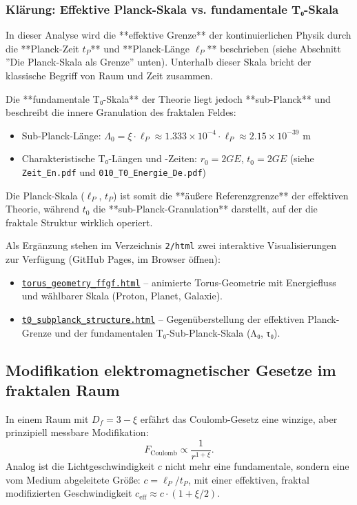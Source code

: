 	\subsubsection{Klärung: Effektive Planck-Skala vs. fundamentale T₀-Skala}
	In dieser Analyse wird die **effektive Grenze** der kontinuierlichen Physik durch die **Planck-Zeit \( t_P \)** und **Planck-Länge \(\ell_P\)** beschrieben (siehe Abschnitt ''Die Planck-Skala als Grenze'' unten). Unterhalb dieser Skala bricht der klassische Begriff von Raum und Zeit zusammen.
	
	Die **fundamentale T₀-Skala** der Theorie liegt jedoch **sub-Planck** und beschreibt die innere Granulation des fraktalen Feldes:
	\begin{itemize}
		\item Sub-Planck-Länge: \(\Lambda_0 = \xi \cdot \ell_P \approx 1.333 \times 10^{-4} \cdot \ell_P \approx 2.15 \times 10^{-39} \) m
		\item Charakteristische T₀-Längen und -Zeiten: \( r_0 = 2GE \), \( t_0 = 2GE \) (siehe \texttt{Zeit\_En.pdf} und \texttt{010\_T0\_Energie\_De.pdf})
	\end{itemize}
	
	Die Planck-Skala (\(\ell_P\), \( t_P \)) ist somit die **äußere Referenzgrenze** der effektiven Theorie, während \( t_0 \) die **sub-Planck-Granulation** darstellt, auf der die fraktale Struktur wirklich operiert.
	
	Als Ergänzung stehen im Verzeichnis \texttt{2/html} zwei interaktive Visualisierungen zur Verfügung (GitHub Pages, im Browser öffnen):
	\begin{itemize}
		\item \href{https://jpascher.github.io/T0-Time-Mass-Duality/2/html/torus_geometry_ffgf.html}{\texttt{torus\_geometry\_ffgf.html}} – animierte Torus-Geometrie mit Energiefluss und wählbarer Skala (Proton, Planet, Galaxie).
		\item \href{https://jpascher.github.io/T0-Time-Mass-Duality/2/html/t0_subplanck_structure.html}{\texttt{t0\_subplanck\_structure.html}} – Gegenüberstellung der effektiven Planck-Grenze und der fundamentalen T₀-Sub-Planck-Skala (Λ₀, τ₀).
	\end{itemize}
	
	\subsection{Modifikation elektromagnetischer Gesetze im fraktalen Raum}
	In einem Raum mit \(D_f = 3-\xi\) erfährt das Coulomb-Gesetz eine winzige, aber prinzipiell messbare Modifikation:
	\begin{equation}
		F_{\text{Coulomb}} \propto \frac{1}{r^{1 + \xi}}.
		\label{eq:fractal_coulomb}
	\end{equation}
	Analog ist die Lichtgeschwindigkeit \(c\) nicht mehr eine fundamentale, sondern eine vom Medium abgeleitete Größe: \(c = \ell_P / t_P\), mit einer effektiven, fraktal modifizierten Geschwindigkeit \(c_{\text{eff}} \approx c \cdot (1 + \xi/2)\).
	
